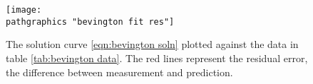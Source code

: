 \begin{figure}[t]
	\texttt{[image: \\pathgraphics "bevington fit res"]}
	\caption{The solution curve \eqref{eqn:bevington soln} plotted against the data in table \eqref{tab:bevington data}. The red lines represent the residual error, the difference between measurement and prediction.}
	\label{fig:solution}
\end{figure}

\endinput  %